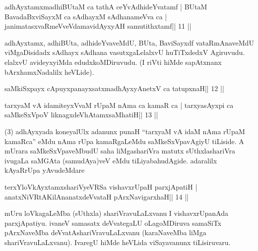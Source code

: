 
\begin{shl}
adhAyxtamxmadhiBUtaM ca tathA ceYvAdhideYvatamf |
BUtaM BavadaBxviSayxM ca sAdhayxM sAdhanameVva ca |
janimatasxvaRmeVveVdamavidAyxyAH samutithxtamf\hfill || 11 ||
\end{shl}

\begin{artha}
adhAyxtamx, adhiBUta, adhideYvaveMdU, BUta, BaviSayxdf vataRmAnaveMdU 
viMgaDisidadx sAdhayx sAdhana vasutxgaLelalxvU huTiTxdedxV Agiruvudu. elalxvU avideyxyiMda edudxkoMDiruvudu. (I riVti hiMde sapAtxnanx bArxhamxNadalilx heVLide).
\end{artha} 
 

\begin{shl}
saMkiSxpayx cApuyxpanayxsatxmadhAyxyAnetxV ca tatupxnaH\hfill || 12 ||
\end{shl}

\begin{shl}
tarxyaM vA idamiteyxVvaM rUpaM nAma ca kamaR ca |
tarxyasAyxpi ca saMkeSxVpoV liknagxdeVhAtamxsaMhatiH\hfill || 13 ||
\end{shl}

\begin{artha}
(3) adhAyxyada koneyalUlx adanunx punaH ``tarxyaM vA idaM nAma rUpaM 
kamaRca'' eMdu nAma rUpa kamaRgaLeMdu saMkeSxVpavAgiyU tiLiside. A mUrara saMkeSxVpaveMbudU saha liMgashariVra matutx sUthxlashariVra ivugaLa saMGAta (samudAya)veV eMdu tiLiyabahudAgide. adaralilx kAyaRrUpa yAvudeMdare  \mdash 
\end{artha}

\begin{shl}
terxYloVkAyxtamxshariVyeVRSa vishavxrUpaH parxjApatiH |
anatxNiVRtAKilAnanatxdeVvataH pArxNavigarxhaH\hfill || 14 ||
\end{shl}

\begin{artha}
mUru loVkagaLeMba (sUthxla) shariVravuLaLxvanu I vishavxrUpanAda 
parxjApatiyu. ivaneV samasatx deVvategaLU oLagoMDiruva samaSiTx pArxNaveMba deVvatAshariVravuLaLxvanu (karaNaveMba liMga shariVravuLaLxvanu). IvaregU hiMde heVLida viSayavanunx tiLisiruvaru.
\end{artha} 
 
 

